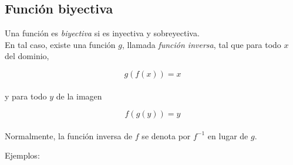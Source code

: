 \documentclass[a4paper,12pt]{article}
\begin{document}
\subsection*{Función biyectiva}

\vspace{1cm}

Una función es \emph{biyectiva} si es inyectiva y sobreyectiva. \\

En tal caso, existe una función $g$, llamada \emph{función inversa}, tal que para todo $x$ del dominio, 

\[g(f(x)) = x\] \\

y para todo $y$ de la imagen

\[ f(g(y)) = y \] \\

Normalmente, la función inversa de $f$ se denota por $f^{-1}$ en lugar de $g$. \\

\newpage

Ejemplos:
\end{document}
